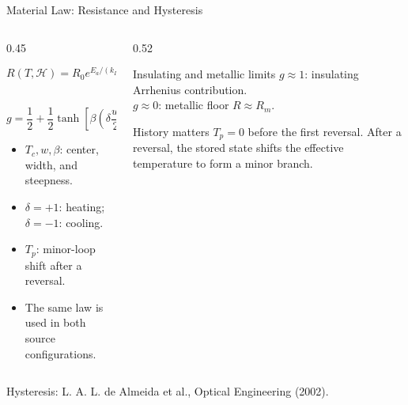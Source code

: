 \documentclass[aspectratio=169]{beamer}
\newcommand{\slidesource}[1]{%
    \vfill
    {\tiny\color{gray}#1}
}
\begin{document}
\begin{frame}{Material Law: Resistance and Hysteresis}

\begin{columns}[T,onlytextwidth]
\begin{column}{0.45\textwidth}
\small

\[
R(T,\mathcal H)
=
R_0 e^{E_a/(k_BT)}
\underbrace{g(T,\mathcal H)}_{\text{insulating fraction}}
+R_m
\]

\[
g=
\frac{1}{2}
+\frac{1}{2}\tanh
\left[
\beta\left(
\delta\frac{w}{2}+T_c-(T+T_p)
\right)
\right]
\]

\scriptsize
\begin{itemize}
    \setlength\itemsep{0.06cm}
    \item \(T_c,w,\beta\): center, width, and steepness.
    \item \(\delta=+1\): heating; \(\delta=-1\): cooling.
    \item \(T_p\): minor-loop shift after a reversal.
    \item The same law is used in both source configurations.
\end{itemize}

\end{column}

\begin{column}{0.52\textwidth}
\centering
\begin{block}{Insulating and metallic limits}
\small
\(g\approx1\): insulating Arrhenius contribution.\\[0.18cm]
\(g\approx0\): metallic floor \(R\approx R_m\).
\end{block}
\begin{block}{History matters}
\small
\(T_p=0\) before the first reversal. After a reversal, the stored state shifts the effective temperature to form a minor branch.
\end{block}
\end{column}
\end{columns}

\slidesource{Hysteresis: L. A. L. de Almeida et al., Optical Engineering (2002).}
\end{frame}
\end{document}
